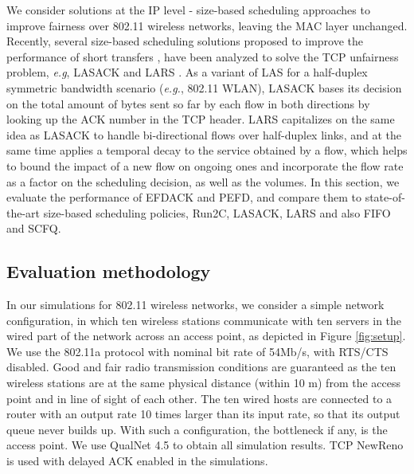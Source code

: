 \documentclass[preprint,12pt]{elsarticle}
\begin{document}
We consider solutions at the IP level - size-based scheduling approaches to improve fairness over 802.11 wireless networks, leaving the MAC layer unchanged. Recently, several size-based scheduling solutions proposed to improve the performance of short transfers \cite{Rai2004Performance,Avrachenkov04Run2c}, have been analyzed to solve the TCP unfairness problem, \textit{e.g}, LASACK \cite{Keller2008Improving} and LARS \cite{heusse2011least}. As a variant of LAS for a half-duplex symmetric bandwidth scenario (\textit{e.g.}, 802.11 WLAN), LASACK bases its decision on the total amount of bytes sent so far by each flow in both directions by looking up the ACK number in the TCP header. LARS capitalizes on the same idea as LASACK to handle bi-directional flows over half-duplex links, and at the same time applies a temporal decay to the service obtained by a flow, which helps to bound the impact of a new flow on ongoing ones and incorporate the flow rate as a factor on the scheduling decision, as well as the volumes. In this section, we evaluate the performance of EFDACK and PEFD, and compare them to state-of-the-art size-based scheduling policies, Run2C, LASACK, LARS and also FIFO and SCFQ. 

\subsection{Evaluation methodology} \label{sec:wireless_methodology}


In our simulations for 802.11 wireless networks, we consider a simple network configuration, in which ten wireless stations communicate with ten servers in the wired part of the network across an access point, as depicted in Figure \ref{fig:setup}. We use the 802.11a protocol with nominal bit rate of 54Mb/s, with RTS/CTS disabled. Good and fair radio transmission conditions are guaranteed as the ten wireless stations are at the same physical distance (within 10 m) from the access point and in line of sight of each other. The ten wired hosts are connected to a router with an output rate 10 times larger than its input rate, so that its output queue never builds up. With such a configuration, the bottleneck if any, is the access point. We use QualNet 4.5 to obtain all simulation results.  TCP NewReno is used with delayed ACK enabled in the simulations. 
\end{document}
